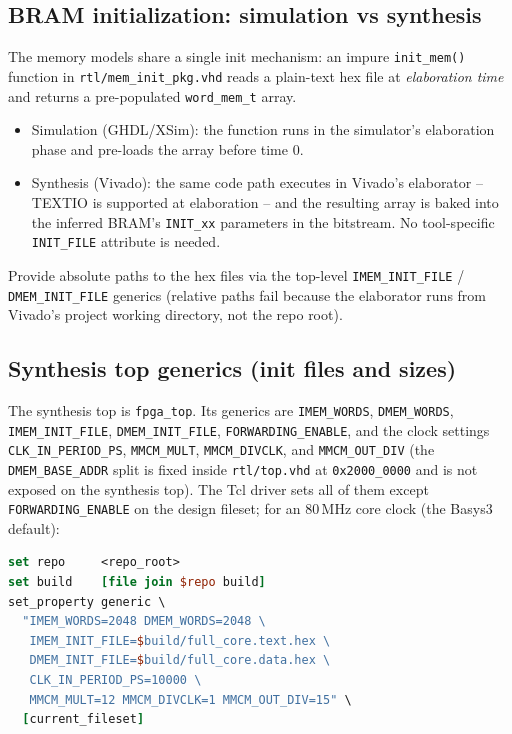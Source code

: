 \subsection{BRAM initialization: simulation vs synthesis}
The memory models share a single init mechanism: an impure
\texttt{init\_mem()} function in \texttt{rtl/mem\_init\_pkg.vhd} reads a
plain-text hex file at \emph{elaboration time} and returns a pre-populated
\texttt{word\_mem\_t} array.
\begin{itemize}[leftmargin=*]
  \item Simulation (GHDL/XSim): the function runs in the simulator's elaboration phase and pre-loads the array before time 0.
  \item Synthesis (Vivado): the same code path executes in Vivado's elaborator -- TEXTIO is supported at elaboration -- and the resulting array is baked into the inferred BRAM's \texttt{INIT\_xx} parameters in the bitstream. No tool-specific \texttt{INIT\_FILE} attribute is needed.
\end{itemize}
Provide absolute paths to the hex files via the top-level
\texttt{IMEM\_INIT\_FILE} / \texttt{DMEM\_INIT\_FILE} generics (relative paths
fail because the elaborator runs from Vivado's project working directory, not
the repo root).

\subsection{Synthesis top generics (init files and sizes)}
The synthesis top is \texttt{fpga\_top}. Its generics are
\texttt{IMEM\_WORDS}, \texttt{DMEM\_WORDS}, \texttt{IMEM\_INIT\_FILE},
\texttt{DMEM\_INIT\_FILE}, \texttt{FORWARDING\_ENABLE}, and the clock
settings \texttt{CLK\_IN\_PERIOD\_PS}, \texttt{MMCM\_MULT},
\texttt{MMCM\_DIVCLK}, and \texttt{MMCM\_OUT\_DIV} (the
\texttt{DMEM\_BASE\_ADDR} split is fixed inside \texttt{rtl/top.vhd} at
\texttt{0x2000\_0000} and is not exposed on the synthesis top). The Tcl
driver sets all of them except \texttt{FORWARDING\_ENABLE} on the design
fileset; for an 80\,MHz core clock (the Basys3 default):
\begin{lstlisting}[style=minrv,language=tcl]
set repo     <repo_root>
set build    [file join $repo build]
set_property generic \
  "IMEM_WORDS=2048 DMEM_WORDS=2048 \
   IMEM_INIT_FILE=$build/full_core.text.hex \
   DMEM_INIT_FILE=$build/full_core.data.hex \
   CLK_IN_PERIOD_PS=10000 \
   MMCM_MULT=12 MMCM_DIVCLK=1 MMCM_OUT_DIV=15" \
  [current_fileset]
\end{lstlisting}

